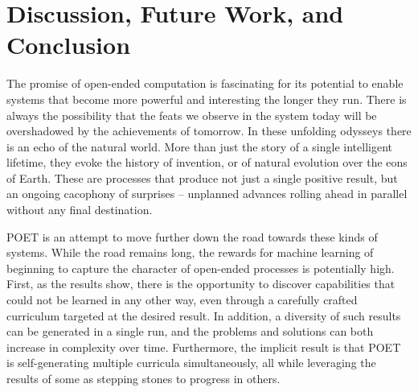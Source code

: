 \documentclass{article}
\newcommand{\jc}[1]{\comments{\textcolor{deepForestGreen}{[JC: #1]}}}
\newcommand{\jl}[1]{\comments{\textcolor{magenta}{[Joel: #1]}}}
\newcommand{\comments}[1]{#1}
\begin{document}

\section{Discussion, Future Work, and Conclusion}

The promise of open-ended computation is fascinating for its potential to enable systems that become more powerful and interesting the longer they run.  There is always the possibility that the feats we observe in the system today will be overshadowed by the achievements of tomorrow. 
In these unfolding odysseys there is an echo of the natural world.  More than just the story of a single intelligent lifetime, they evoke the history of invention, or of natural evolution over the eons of Earth.  These are processes that produce not just a single positive result, but an ongoing cacophony of surprises -- unplanned advances rolling ahead in parallel without any final destination.  

POET is an attempt to move further down the road towards these kinds of systems.  While the road remains long, the rewards for machine learning of beginning to capture the character of open-ended processes is potentially high.  First, as the results show, there is the opportunity to discover capabilities that could not be learned in any other way, even through a carefully crafted curriculum targeted at the desired result.  In addition, a diversity of such results can be generated in a single run, and the problems and solutions can both increase in complexity over time.  Furthermore, the implicit result is that POET is self-generating multiple curricula simultaneously, all while leveraging the results of some as stepping stones to progress in others.   
\end{document}
